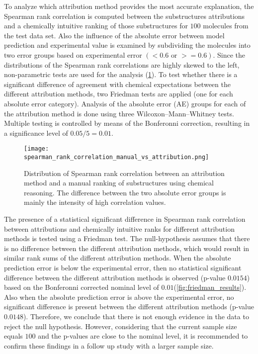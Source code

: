 

To analyze which attribution method provides the most accurate
explanation, the Spearman rank correlation is computed between the
substructures attributions and a chemically intuitive ranking of those
substructures for $100$ molecules from the test data set. Also the influence of the absolute error between model
prediction and experimental value is examined by subdividing the
molecules into two error groups based on experimental error $(<0.6 \text{ or } >=0.6)$. Since the distributions of
the Spearman rank correlations are highly skewed to the left,
non-parametric tests are used for the analysis (\cref{fig:spearman_corr_manual}). To test whether there is
a significant difference of agreement with chemical expectations between 
the different attribution methods, two Friedman tests are applied (one for each absolute error
category). Analysis of the absolute error (AE) groups for each of 
the attribution method is done using three Wilcoxon--Mann--Whitney tests.
Multiple testing is controlled by means of the Bonferonni correction, 
resulting in a significance level of $0.05/5 = 0.01$.


\begin{figure}[h]
    \centering
    \texttt{[image: spearman\_rank\_correlation\_manual\_vs\_attribution.png]}
    \caption{Distribution of Spearman rank correlation between an attribution method 
        and a manual ranking of substructures using chemical reasoning. The difference 
        between the two absolute error groups is mainly the intensity of high 
        correlation values.
    }
    \label{fig:spearman_corr_manual}
\end{figure}


The presence of a statistical significant difference in Spearman rank correlation
between attributions and chemically intuitive ranks for different
attribution methods is tested using a Friedman test. The null-hypothesis
assumes that there is no difference between the different attribution
methods, which would result in similar rank sums of the different
attribution methods. When the absolute prediction error is below the 
experimental error, then no statistical significant difference between 
the different attribution methods is observed (p-value $0.0154$) based 
on the Bonferonni corrected nominal level of $0.01$(\cref{fig:friedman_results}). 
Also when the absolute prediction error is above the experimental error, no significant difference 
is present between the different attribution methods (p-value $0.0148$). 
Therefore, we conclude that there is not enough
evidence in the data to reject the null hypothesis. However, considering 
that the current sample size equals $100$ and the p-values are close to the 
nominal level, it is recommended to confirm these findings in a follow up 
study with a larger sample size.


